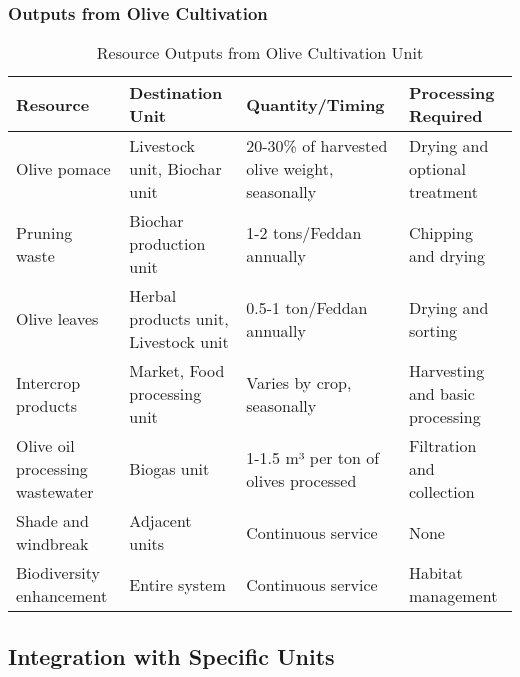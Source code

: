 \subsubsection{Outputs from Olive Cultivation}
\begin{table}[h]
\centering
\begin{tabular}{|p{4cm}|p{4cm}|p{4cm}|p{4cm}|}
\hline
\textbf{Resource} & \textbf{Destination Unit} & \textbf{Quantity/Timing} & \textbf{Processing Required} \\
\hline
Olive pomace & Livestock unit, Biochar unit & 20-30\% of harvested olive weight, seasonally & Drying and optional treatment \\
\hline
Pruning waste & Biochar production unit & 1-2 tons/Feddan annually & Chipping and drying \\
\hline
Olive leaves & Herbal products unit, Livestock unit & 0.5-1 ton/Feddan annually & Drying and sorting \\
\hline
Intercrop products & Market, Food processing unit & Varies by crop, seasonally & Harvesting and basic processing \\
\hline
Olive oil processing wastewater & Biogas unit & 1-1.5 m³ per ton of olives processed & Filtration and collection \\
\hline
Shade and windbreak & Adjacent units & Continuous service & None \\
\hline
Biodiversity enhancement & Entire system & Continuous service & Habitat management \\
\hline
\end{tabular}
\caption{Resource Outputs from Olive Cultivation Unit}
\end{table}

\subsection{Integration with Specific Units}

